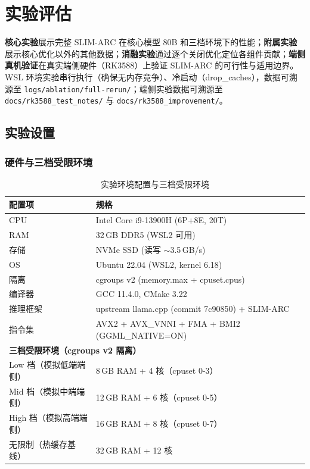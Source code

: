 \newpage
\section{实验评估}

\textbf{核心实验}展示完整 SLIM-ARC 在核心模型 80B 和三档环境下的性能；\textbf{附属实验}展示核心优化以外的其他数据；\textbf{消融实验}通过逐个关闭优化定位各组件贡献；\textbf{端侧真机验证}在真实端侧硬件（RK3588）上验证 SLIM-ARC 的可行性与适用边界。WSL 环境实验串行执行（确保无内存竞争）、冷启动（drop\_caches），数据可溯源至 \texttt{logs/ablation/full-rerun/}；端侧实验数据可溯源至 \texttt{docs/rk3588\_test\_notes/} 与 \texttt{docs/rk3588\_improvement/}。

\subsection{实验设置}

\subsubsection{硬件与三档受限环境}

\begin{table}[H]
    \centering
    \caption{实验环境配置与三档受限环境}
    \label{tab:eval_env}
    \begin{tabular}{ll}
        \toprule
        \textbf{配置项} & \textbf{规格} \\
        \midrule
        CPU & Intel Core i9-13900H (6P+8E, 20T) \\
        RAM & 32\,GB DDR5 (WSL2 可用) \\
        存储 & NVMe SSD (读写 $\sim$3.5\,GB/s) \\
        OS & Ubuntu 22.04 (WSL2, kernel 6.18) \\
        隔离 & cgroups v2 (memory.max + cpuset.cpus) \\
        编译器 & GCC 11.4.0, CMake 3.22 \\
        推理框架 & upstream llama.cpp (commit 7c90850) + SLIM-ARC \\
        指令集 & AVX2 + AVX\_VNNI + FMA + BMI2 (GGML\_NATIVE=ON) \\
        \midrule
        \multicolumn{2}{l}{\textbf{三档受限环境（cgroups v2 隔离）}} \\
        \midrule
        Low 档（模拟低端端侧） & 8\,GB RAM + 4 核（cpuset 0-3） \\
        Mid 档（模拟中端端侧） & 12\,GB RAM + 6 核（cpuset 0-5） \\
        High 档（模拟高端端侧） & 16\,GB RAM + 8 核（cpuset 0-7） \\
        无限制（热缓存基线） & 32\,GB RAM + 12 核 \\
        \bottomrule
    \end{tabular}
\end{table}

